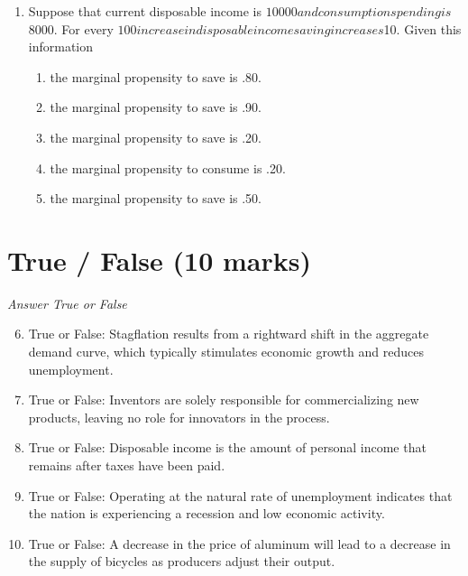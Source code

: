 \documentclass[12pt]{article}
\begin{document}
\begin{enumerate}[label=\arabic*.]
\begin{enumerate}[label=(\alph*)]
    \item A method that minimizes the time taken to produce a product
    \item A method that uses more of all inputs to increase output
    \item A method that produces the highest quantity of output
    \item A method that relies solely on the latest technology
    \item A method that achieves the fastest production speed regardless of resource usage
\end{enumerate}
\item Suppose that current disposable income is $10000 and consumption spending is $8000. For every $100 increase in disposable income saving increases $10. Given this information
\begin{enumerate}[label=(\alph*)]
    \item the marginal propensity to save is .80.
    \item the marginal propensity to save is .90.
    \item the marginal propensity to save is .20.
    \item the marginal propensity to consume is .20.
    \item the marginal propensity to save is .50.
\end{enumerate}
\end{enumerate}

\section*{True / False (10 marks)}
\textit{Answer True or False}
\begin{enumerate}[label=\arabic*.]
\setcounter{enumi}{5}
\item True or False: Stagflation results from a rightward shift in the aggregate demand curve, which typically stimulates economic growth and reduces unemployment.
\item True or False: Inventors are solely responsible for commercializing new products, leaving no role for innovators in the process.
\item True or False: Disposable income is the amount of personal income that remains after taxes have been paid.
\item True or False: Operating at the natural rate of unemployment indicates that the nation is experiencing a recession and low economic activity.
\item True or False: A decrease in the price of aluminum will lead to a decrease in the supply of bicycles as producers adjust their output.
\end{enumerate}
\end{document}
